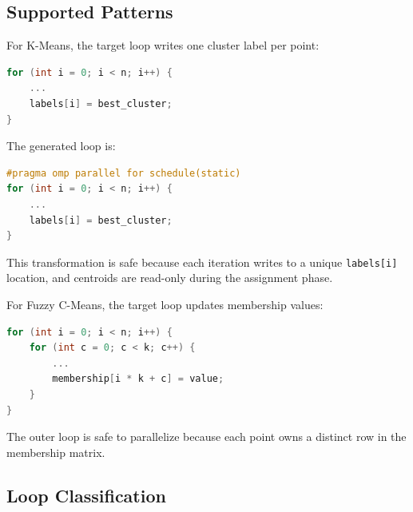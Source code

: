 \documentclass[conference,10pt]{IEEEtran}
\begin{document}
\subsection{Supported Patterns}

For K-Means, the target loop writes one cluster label per point:

\vspace{6pt}
\noindent{}\par
\vspace{4pt}
\begin{lstlisting}[language=C]
for (int i = 0; i < n; i++) {
    ...
    labels[i] = best_cluster;
}
\end{lstlisting}

The generated loop is:

\vspace{6pt}
\noindent{}\par
\vspace{4pt}
\begin{lstlisting}[language=C]
#pragma omp parallel for schedule(static)
for (int i = 0; i < n; i++) {
    ...
    labels[i] = best_cluster;
}
\end{lstlisting}

This transformation is safe because each iteration writes to a unique \texttt{labels[i]} location, and centroids are read-only during the assignment phase.

For Fuzzy C-Means, the target loop updates membership values:

\vspace{6pt}
\noindent{}\par
\vspace{4pt}
\begin{lstlisting}[language=C]
for (int i = 0; i < n; i++) {
    for (int c = 0; c < k; c++) {
        ...
        membership[i * k + c] = value;
    }
}
\end{lstlisting}

The outer loop is safe to parallelize because each point owns a distinct row in the membership matrix.

\subsection{Loop Classification}
\end{document}
